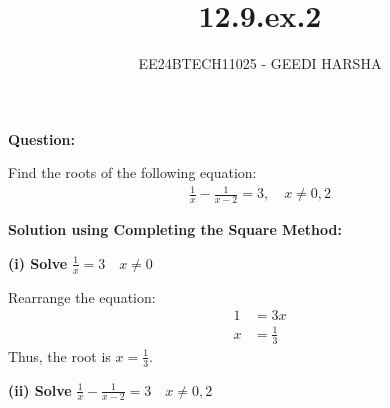 \documentclass[journal]{IEEEtran}
\begin{document}

\vspace{3cm}
\title{12.9.ex.2}
\author{EE24BTECH11025 - GEEDI HARSHA}
{\let\newpage\relax\maketitle}

\renewcommand{\thefigure}{\theenumi}
\renewcommand{\thetable}{\theenumi}
\setlength{\intextsep}{10pt} %


\renewcommand{\thetable}{\theenumi}

\textbf{Question:}

Find the roots of the following equation:
\begin{align}
    \frac{1}{x} - \frac{1}{x-2} = 3, \quad x \neq 0,2
\end{align}


\textbf{Solution using Completing the Square Method:}

\textbf{(i) Solve } $\frac{1}{x} = 3 \quad x \neq 0$

Rearrange the equation:
\begin{align}
    1 &= 3x \\
    x &= \frac{1}{3}
\end{align}
Thus, the root is $x = \frac{1}{3}$.

\textbf{(ii) Solve } $\frac{1}{x} - \frac{1}{x-2} = 3 \quad x \neq 0,2$
\end{document}
